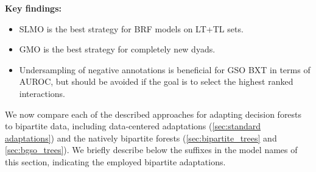 \begin{mdframed}
    \textbf{Key findings:}
    \begin{itemize}
        \item SLMO is the best strategy for BRF models on LT+TL sets.
        \item GMO is the best strategy for completely new dyads.
        \item Undersampling of negative annotations is beneficial for GSO BXT in terms of AUROC, but should be avoided if the goal is to select the highest ranked interactions.
    \end{itemize}
\end{mdframed}

We now compare each of the described approaches for adapting decision forests to bipartite data, including data-centered adaptations (\autoref{sec:standard adaptations}) and the natively bipartite forests (\autoref{sec:bipartite_trees} and \autoref{sec:bgso_trees}). We briefly describe below the suffixes in the model names of this section, indicating the employed bipartite adaptations.



